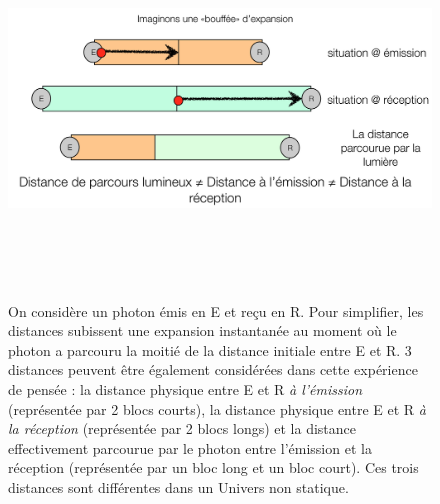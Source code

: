 \begin{figure}[htbp]
	\centering
		\includegraphics[height=10cm]{figs/dlum.png}
	\caption[Distance de parcours lumineux]{On considère un photon émis en E et reçu en R. Pour simplifier, les distances subissent une expansion instantanée au moment où le photon a parcouru la moitié de la distance initiale entre E et R. 3 distances peuvent être également considérées dans cette expérience de pensée : la distance physique entre E et R \textit{à l'émission} (représentée par 2 blocs courts), la distance physique entre E et R \textit{à la réception} (représentée par 2 blocs longs) et la distance effectivement parcourue par le photon entre l'émission et la réception (représentée par un bloc long et un bloc court). Ces trois distances sont différentes dans un Univers non statique. }
	\label{f:dlum}
\end{figure}

